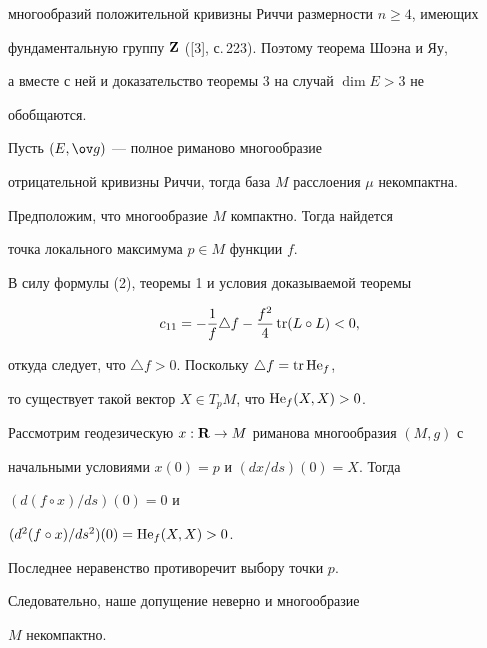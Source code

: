 многообразий положительной кривизны Риччи размерности $n\ge 4$, имеющих


фундаментальную группу ${\bold Z}$ ([3], с.\,223). Поэтому теорема Шоэна и Яу,


а вместе с ней и доказательство теоремы 3 на случай $\dim E>3$ не


обобщаются.





\begin{thm}


Пусть $(E,\g)$ --- полное риманово многообразие


отрицательной кривизны Риччи, тогда база $M$ расслоения $\mu$ некомпактна.


\end{thm}





\begin{pf}


Предположим, что многообразие $M$ компактно. Тогда найдется


точка локального максимума $p\in M$ функции $f$.


В силу формулы (2), теоремы 1 и условия доказываемой теоремы


$$


c_{11}=-\frac{1}{f}\triangle f-\frac{f^2}{4}\tr(L\circ L)<0,


$$


откуда следует, что $\triangle f>0$. Поскольку $\triangle f=\operatorname{tr}\operatorname{He}_f$,


то существует такой вектор $X\in T_pM$, что $\operatorname{He}_f(X,X)>0$.





Рассмотрим геодезическую $x:{\bold R}\to M$ риманова многообразия $(M,g)$ с


начальными условиями $x(0)=p$ и $(dx/ds)(0)=X$. Тогда


$(d(f\circ x)/ds)(0)=0 $ и


$(d^{2}(f\circ x)/ds^{2})(0)=\operatorname{He}_f(X,X)>0$.


Последнее неравенство противоречит выбору точки $p$.


Следовательно, наше допущение неверно и многообразие


$M$ некомпактно.


\end{pf}





